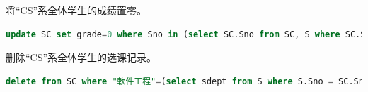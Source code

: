 \documentclass[12pt, a4paper]{report}
\begin{document}
将“CS”系全体学生的成绩置零。\\

\begin{lstlisting}[language=SQL]
    update SC set grade=0 where Sno in (select SC.Sno from SC, S where SC.Sno=S.Sno and S.sdept="軟件工程");
\end{lstlisting}

\begin{figure}[H] %
    \centering %
\end{figure}

删除“CS”系全体学生的选课记录。\\

\begin{lstlisting}[language=SQL]
    delete from SC where "軟件工程"=(select sdept from S where S.Sno = SC.Sno);
\end{lstlisting}

\begin{figure}[H] %
    \centering %
\end{figure}
\end{document}

